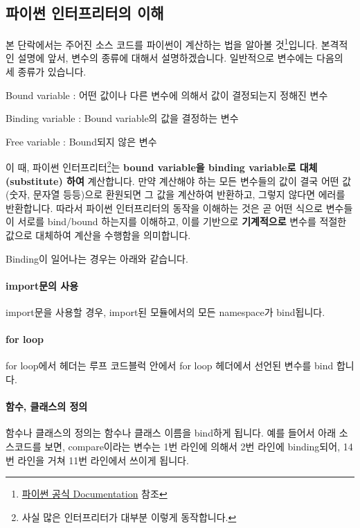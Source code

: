 \subsection{파이썬 인터프리터의 이해}

본 단락에서는 주어진 소스 코드를 파이썬이 계산하는 법을 알아볼 것\footnote{\href{https://docs.python.org/3/reference/executionmodel.html}{파이썬 공식 Documentation} 참조}입니다. 본격적인 설명에 앞서, 변수의 종류에 대해서 설명하겠습니다. 일반적으로 변수에는 다음의 세 종류가 있습니다. 

\begin{compactitem} 
\item Bound variable : 어떤 값이나 다른 변수에 의해서 값이 결정되는지 정해진 변수
\item Binding variable : Bound variable의 값을 결정하는 변수 
\item Free variable : Bound되지 않은 변수 
\end{compactitem}

이 때, 파이썬 인터프리터\footnote{사실 많은 인터프리터가 대부분 이렇게 동작합니다.}는 \textbf{bound variable을 binding variable로 대체(substitute) 하여} 계산합니다. 만약 계산해야 하는 모든 변수들의 값이 결국 어떤 값(숫자, 문자열 등등)으로 환원되면 그 값을 계산하여 반환하고, 그렇지 않다면 에러를 반환합니다. 따라서 파이썬 인터프리터의 동작을 이해하는 것은 곧 어떤 식으로 변수들이 서로를 bind/bound 하는지를 이해하고, 이를 기반으로 \textbf{기계적으로} 변수를 적절한 값으로 대체하여 계산을 수행함을 의미합니다. 

Binding이 일어나는 경우는 아래와 같습니다. 

\paragraph{import문의 사용} import문을 사용할 경우, import된 모듈에서의 모든 namespace가 bind됩니다. 

\paragraph{for loop} for loop에서 헤더는 루프 코드블럭 안에서 for loop 헤더에서 선언된 변수를 bind 합니다. 

\paragraph{함수, 클래스의 정의} 함수나 클래스의 정의는 함수나 클래스 이름을 bind하게 됩니다. 예를 들어서 아래 소스코드를 보면, compare이라는 변수는 1번 라인에 의해서 2번 라인에 binding되어, 14번 라인을 거쳐 11번 라인에서 쓰이게 됩니다. 


